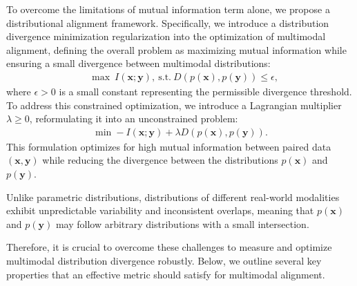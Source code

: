 {To overcome the limitations of mutual information term alone, we propose a distributional alignment framework.}
Specifically, we introduce a distribution divergence minimization regularization into the optimization of multimodal alignment, defining the overall problem as maximizing mutual information while ensuring a small divergence between multimodal distributions: 
\begin{equation}
\begin{aligned}
&\max ~ I(\mathbf{x}; \mathbf{y}), ~ \text{s.t.} ~ D(p(\mathbf{x}), p(\mathbf{y})) \leq \epsilon,
\end{aligned}
\end{equation}
where \(\epsilon > 0\) is a small constant representing the permissible divergence threshold.  To address this constrained optimization, we introduce a Lagrangian multiplier \(\lambda \geq 0\), reformulating it into an unconstrained problem:   
\begin{equation}
\begin{aligned}
\min  -I(\mathbf{x}; \mathbf{y}) + \lambda D(p(\mathbf{x}), p(\mathbf{y})).
\end{aligned}
\label{eq:objective}
\end{equation}
This formulation optimizes for high mutual information between paired data \((\mathbf{x}, \mathbf{y})\) while reducing the divergence between the distributions \(p(\mathbf{x})\) and \(p(\mathbf{y})\).  


Unlike parametric distributions, distributions of different real-world modalities exhibit unpredictable variability and inconsistent overlaps, meaning that $p(\mathbf{x})$ and $p(\mathbf{y})$ may follow arbitrary distributions with a small intersection.

%
%
Therefore, it is crucial to overcome these challenges to measure and optimize multimodal distribution divergence robustly.
Below, we outline several key properties that an effective metric should satisfy for multimodal alignment.


